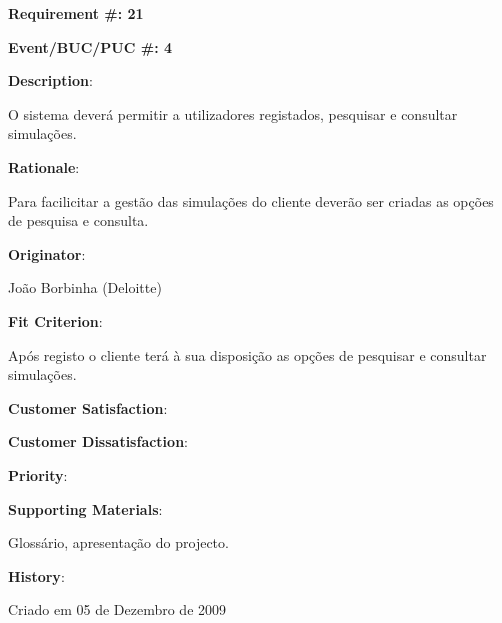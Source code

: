 \pagebreak

\begin{minipage}{0.55\textwidth}
\begin{flushleft}\textbf{Requirement \#: 21}\end{flushleft}
\end{minipage}
\begin{minipage}{0.4\textwidth}
\begin{flushright}\textbf{Event/BUC/PUC \#: 4}\end{flushright}
\end{minipage}

\begin{description}

\item \textbf{Description}:

O sistema deverá permitir a utilizadores registados, pesquisar e consultar simulações.\\

\item \textbf{Rationale}:

Para facilicitar a gestão das simulações do cliente deverão ser criadas as opções de pesquisa e consulta.\\

\item \textbf{Originator}:

João Borbinha (Deloitte)\\

\item \textbf{Fit Criterion}:

Após registo o cliente terá à sua disposição as opções de pesquisar e consultar simulações.\\

\begin{minipage}{0.45\textwidth}
\begin{flushleft}\item \textbf{Customer Satisfaction}:\end{flushleft}
\end{minipage}
\begin{minipage}{0.45\textwidth}
\begin{flushleft}\item \textbf{Customer Dissatisfaction}:\end{flushleft}
\end{minipage}

\item \textbf{Priority}:\\

\item \textbf{Supporting Materials}:

Glossário, apresentação do projecto.\\

\item \textbf{History}:

Criado em 05 de Dezembro de 2009\\

\end{description}
